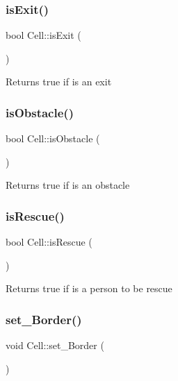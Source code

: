 \subsubsection{\texorpdfstring{is\+Exit()}{isExit()}}
{\footnotesize\ttfamily bool Cell\+::is\+Exit (\begin{DoxyParamCaption}{ }\end{DoxyParamCaption})}

\begin{DoxyReturn}{Returns}
true if is an exit 
\end{DoxyReturn}
\mbox{\label{class_cell_aee32093f779b1fa761b43a6b0a86ed6c}} 
\subsubsection{\texorpdfstring{is\+Obstacle()}{isObstacle()}}
{\footnotesize\ttfamily bool Cell\+::is\+Obstacle (\begin{DoxyParamCaption}{ }\end{DoxyParamCaption})}

\begin{DoxyReturn}{Returns}
true if is an obstacle 
\end{DoxyReturn}
\mbox{\label{class_cell_ad86a719c04ff04bdf79c1c0b8e5a5942}} 
\subsubsection{\texorpdfstring{is\+Rescue()}{isRescue()}}
{\footnotesize\ttfamily bool Cell\+::is\+Rescue (\begin{DoxyParamCaption}{ }\end{DoxyParamCaption})}

\begin{DoxyReturn}{Returns}
true if is a person to be rescue 
\end{DoxyReturn}
\mbox{\label{class_cell_aaf2c6b0f530432a4a2b47fbbf45c8ba0}} 
\subsubsection{\texorpdfstring{set\+\_\+\+Border()}{set\_Border()}}
{\footnotesize\ttfamily void Cell\+::set\+\_\+\+Border (\begin{DoxyParamCaption}{ }\end{DoxyParamCaption})}

